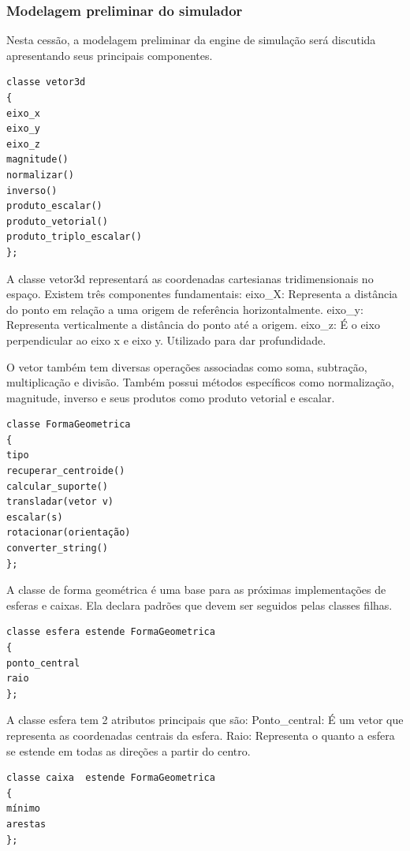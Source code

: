 \subsubsection{Modelagem preliminar do simulador}
Nesta cessão, a modelagem preliminar da engine de simulação será discutida apresentando seus principais componentes.

\begin{lstlisting}[frame=single,caption=Código de exemplo\label{codigo1}]
classe vetor3d
{
eixo_x
eixo_y
eixo_z
magnitude()
normalizar()
inverso()
produto_escalar()
produto_vetorial()
produto_triplo_escalar()
};
\end{lstlisting}

A classe vetor3d representará as coordenadas cartesianas tridimensionais no espaço.
Existem três componentes fundamentais:
eixo_X: Representa a distância do ponto em relação a uma origem de referência horizontalmente.
eixo_y: Representa verticalmente a distância do ponto até a origem.
eixo_z: É o eixo perpendicular ao eixo x e eixo y. Utilizado para dar profundidade.

O vetor também tem diversas operações associadas como soma, subtração,
multiplicação e divisão. Também possui métodos específicos como normalização,
magnitude, inverso e seus produtos como produto vetorial e escalar.

\begin{lstlisting}[frame=single,caption=Código de exemplo\label{codigo1}]
classe FormaGeometrica
{
tipo
recuperar_centroide()
calcular_suporte()
transladar(vetor v)
escalar(s)
rotacionar(orientação)
converter_string()
};
\end{lstlisting}

A classe de forma geométrica é uma base para as próximas implementações de
esferas e caixas.
Ela declara padrões que devem ser seguidos pelas classes filhas.

\begin{lstlisting}[frame=single,caption=Código de exemplo\label{codigo1}]
classe esfera estende FormaGeometrica
{
ponto_central
raio
};
\end{lstlisting}


A classe esfera tem 2 atributos principais que são:
Ponto_central: É um vetor que representa as coordenadas centrais da esfera.
Raio: Representa o quanto a esfera se estende em todas as direções a partir do
centro.

\begin{lstlisting}[frame=single,caption=Código de exemplo\label{codigo1}]
classe caixa  estende FormaGeometrica
{
mínimo
arestas
};
\end{lstlisting}

